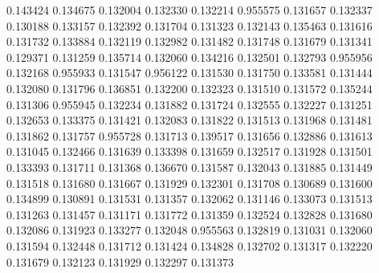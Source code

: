 0.143424
0.134675
0.132004
0.132330
0.132214
0.955575
0.131657
0.132337
0.130188
0.133157
0.132392
0.131704
0.131323
0.132143
0.135463
0.131616
0.131732
0.133884
0.132119
0.132982
0.131482
0.131748
0.131679
0.131341
0.129371
0.131259
0.135714
0.132060
0.134216
0.132501
0.132793
0.955956
0.132168
0.955933
0.131547
0.956122
0.131530
0.131750
0.133581
0.131444
0.132080
0.131796
0.136851
0.132200
0.132323
0.131510
0.131572
0.135244
0.131306
0.955945
0.132234
0.131882
0.131724
0.132555
0.132227
0.131251
0.132653
0.133375
0.131421
0.132083
0.131822
0.131513
0.131968
0.131481
0.131862
0.131757
0.955728
0.131713
0.139517
0.131656
0.132886
0.131613
0.131045
0.132466
0.131639
0.133398
0.131659
0.132517
0.131928
0.131501
0.133393
0.131711
0.131368
0.136670
0.131587
0.132043
0.131885
0.131449
0.131518
0.131680
0.131667
0.131929
0.132301
0.131708
0.130689
0.131600
0.134899
0.130891
0.131531
0.131357
0.132062
0.131146
0.133073
0.131513
0.131263
0.131457
0.131171
0.131772
0.131359
0.132524
0.132828
0.131680
0.132086
0.131923
0.133277
0.132048
0.955563
0.132819
0.131031
0.132060
0.131594
0.132448
0.131712
0.131424
0.134828
0.132702
0.131317
0.132220
0.131679
0.132123
0.131929
0.132297
0.131373
